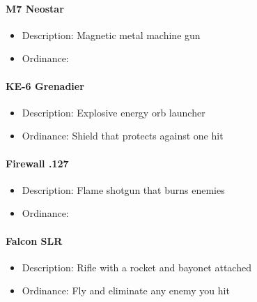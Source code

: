 \documentclass[../Main.tex]{subfiles}
\begin{document}
\paragraph{M7 Neostar}

\begin{itemize}
	\item Description: Magnetic metal machine gun
	\item Ordinance:
\end{itemize} 


\paragraph{KE-6 Grenadier}
 
\begin{itemize}
	\item Description: Explosive energy orb launcher
	\item Ordinance: Shield that protects against one hit
\end{itemize} 

\paragraph{Firewall .127}

\begin{itemize}
	\item Description: Flame shotgun that burns enemies
	\item Ordinance: 
\end{itemize} 

\paragraph{Falcon SLR}

\begin{itemize}
	\item Description: Rifle with a rocket and bayonet attached
	\item Ordinance: Fly and eliminate any enemy you hit
\end{itemize} 
\end{document}
